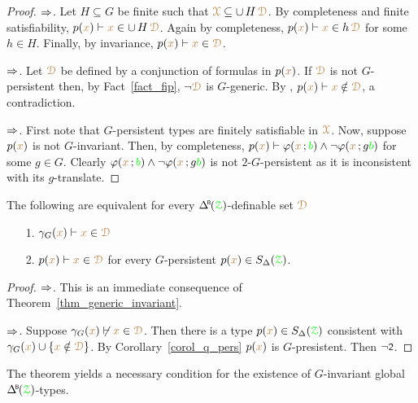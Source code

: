 \begin{proof}
  $\Rightarrow$.
  Let $H\subseteq G$ be finite such that ${\color{brown}\EuScript X}\subseteq\cup\,H\,{\color{brown}\EuScript D}$.
  By completeness and finite satisfiability, $p({\color{brown} x})\vdash {\color{brown}x}\in\cup\,H\,{\color{brown}\EuScript D}$.
  Again by completeness, $p({\color{brown} x})\vdash {\color{brown}x}\in h\,{\color{brown}\EuScript D}$ for some $h\in H$.
  Finally, by invariance,  $p({\color{brown} x})\vdash{\color{brown}x}\in{\color{brown}\EuScript D}$.
  
  $\Rightarrow$.
  Let ${\color{brown}\EuScript D}$ be defined by a conjunction of formulas in $p({\color{brown} x})$.
  If ${\color{brown}\EuScript D}$ is not $G$-persistent then, by Fact~\ref{fact_fip}, $\neg{\color{brown}\EuScript D}$ is $G$-generic. 
  By , $p({\color{brown} x})\vdash{\color{brown}x}\notin{\color{brown}\EuScript D}$, a contradiction.

  $\Rightarrow$.
  First note that $G$-persistent types are finitely satisfiable in ${\color{brown}\EuScript X}$.
  Now, suppose $p({\color{brown} x})$ is not $G$-invariant.
  Then, by completeness, $p({\color{brown} x})\vdash\varphi({\color{brown} x}\,;{\color{green} b})\wedge\neg\varphi({\color{brown} x}\,;g{\color{green} b})$ for some $g\in G$.
  Clearly $\varphi({\color{brown} x}\,;{\color{green} b})\wedge\neg\varphi({\color{brown} x}\,;g{\color{green} b})$ is not $2$-$G$-persistent as it is inconsistent with its $g$-translate.
\end{proof}

\begin{corollary}\label{corol_gammaG_invaqriancer}
  The following are equivalent for every $\BDelta(\grZ)$-definable set ${\color{brown}\EuScript D}$
  \begin{itemize}
    \item [1.] $\gamma_G({\color{brown} x})\vdash{\color{brown}x}\in{\color{brown}\EuScript D}$
    \item [2.] $p({\color{brown} x})\vdash{\color{brown}x}\in{\color{brown}\EuScript D}$ for every $G$-persistent $p({\color{brown} x})\in S_\Delta({\color{green}\EuScript Z})$.
  \end{itemize}
\end{corollary}

\begin{proof}
  $\Rightarrow$.
  This is an immediate consequence of Theorem~\ref{thm_generic_invariant}.

  $\Rightarrow$.
  Suppose $\gamma_G({\color{brown} x})\not\vdash{\color{brown}x}\in{\color{brown}\EuScript D}$.
  Then there is a type $p({\color{brown} x})\in S_\Delta({\color{green}\EuScript Z})$ consistent with $\gamma_G({\color{brown} x})\cup\{{\color{brown} x}\notin{\color{brown}\EuScript D}\}$.
  By Corollary~\ref{corol_q_pers} $p({\color{brown} x})$ is $G$-presistent.
  Then $\neg\textsf{\small 2}$.
\end{proof}

The theorem yields a necessary condition for the existence of $G$-invariant global $\BDelta({\grZ})$-types.


